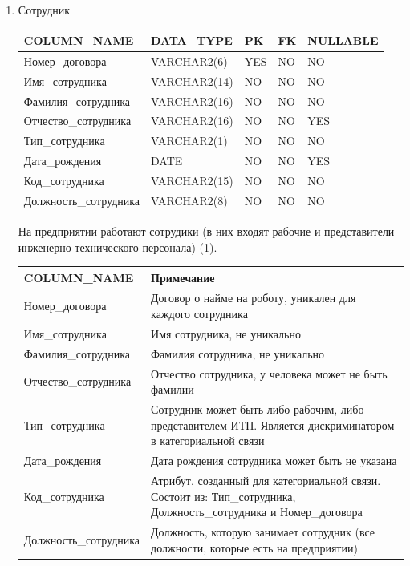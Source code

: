 \begin{enumerate}
    \item{Сотрудник}

    \begin{tabular}{|p{7cm}|p{3cm}|p{1cm}|p{1cm}|p{3cm}|} \hline

        {\bf COLUMN\_NAME} & {\bf DATA\_TYPE} & {\bf PK} & {\bf FK} & {\bf NULLABLE} \\ \hline
        Номер\_договора & VARCHAR2(6) & YES & NO & NO \\ \hline
        Имя\_сотрудника & VARCHAR2(14) & NO & NO & NO \\ \hline
        Фамилия\_сотрудника & VARCHAR2(16) & NO & NO & NO \\ \hline
        Отчество\_сотрудника & VARCHAR2(16) & NO & NO & YES \\ \hline
        Тип\_сотрудника & VARCHAR2(1) & NO & NO & NO \\ \hline
        Дата\_рождения & DATE & NO & NO & YES \\ \hline
        Код\_сотрудника & VARCHAR2(15) & NO & NO & NO \\ \hline
        Должность\_сотрудника & VARCHAR2(8) & NO & NO & NO \\ \hline

    \end{tabular}

    На предприятии работают \underline{сотрудики} (в них входят рабочие и представители инженерно-технического персонала) (1).

    \begin{tabular}{|p{7cm}|p{9.3cm}|} \hline

        {\bf COLUMN\_NAME} & {\bf Примечание} \\ \hline
        Номер\_договора &  Договор о найме на роботу, уникален для каждого сотрудника \\ \hline
        Имя\_сотрудника &  Имя сотрудника, не уникально \\ \hline
        Фамилия\_сотрудника & Фамилия сотрудника, не уникально \\ \hline
        Отчество\_сотрудника & Отчество сотрудника, у человека может не быть фамилии \\ \hline
        Тип\_сотрудника & Сотрудник может быть либо рабочим, либо представителем ИТП. Является дискриминатором в категориальной связи \\ \hline
        Дата\_рождения & Дата рождения сотрудника может быть не указана \\ \hline
        Код\_сотрудника & Атрибут, созданный для категориальной связи. Состоит из: Тип\_сотрудника, Должность\_сотрудника и Номер\_договора \\ \hline
        Должность\_сотрудника & Должность, которую занимает сотрудник (все должности, которые есть на предприятии) \\ \hline


\end{tabular}
\end{enumerate}

